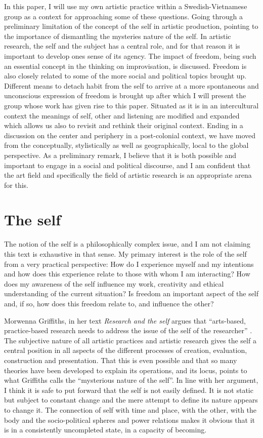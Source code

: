 \documentclass[a4paper]{article}
\begin{document}
In this paper, I will use my own artistic practice within a Swedish-Vietnamese group as a context for approaching some of these questions. Going through a preliminary limitation of the concept of the self in artistic production, pointing to the importance of dismantling the mysteries nature of the self. In artistic research, the self and the subject has a central role, and for that reason it is important to develop ones sense of its agency. The impact of freedom, being such an essential concept in the thinking on improvisation, is discussed. Freedom is also closely related to some of the more social and political topics brought up. Different means to detach habit from the self to arrive at a more spontaneous and unconscious expression of freedom is brought up after which I will present the group whose work has given rise to this paper. Situated as it is in an intercultural context the meanings of self, other and listening are modified and expanded which allows us also to revisit and rethink their original context. Ending in a discussion on the center and periphery in a post-colonial context, we have moved from the conceptually, stylistically as well as geographically, local to the global perspective. As a preliminary remark, I believe that it is both possible and important to engage in a social and political discourse, and I am confident that the art field and specifically the field of artistic research is an appropriate arena for this.


\section*{The self}
\label{sec:self-artist-prod}

The notion of the self is a philosophically complex issue, and I am not claiming this text is exhaustive in that sense. My primary interest is the role of the self from a very practical perspective: How do I experience myself and my intentions and how does this experience relate to those with whom I am interacting? How does my awareness of the self influence my work, creativity and ethical understanding of the current situation? Is freedom an important aspect of the self and, if so, how does this freedom relate to, and influence the other? 

Morwenna Griffiths, in her text \emph{Research and the self} argues that ``arts-based, practice-based research needs to address the issue of the self of the researcher'' \citep[][p. 167]{griffiths10}. The subjective nature of all artistic practices and artistic research gives the self a central position in all aspects of the different processes of creation, evaluation, construction and presentation. That this is even possible and that so many theories have been developed to explain its operations, and its locus, points to what Griffiths calls the ``mysterious nature of the self''. In line with her argument, I think it is safe to put forward that the self is not easily defined. It is not static  but subject to constant change and the mere attempt to define its nature appears to change it. The connection of self with time and place, with the other, with the body and the socio-political spheres and power relations makes it obvious that it is in a consistently uncompleted state, in a capacity of becoming.
\end{document}
